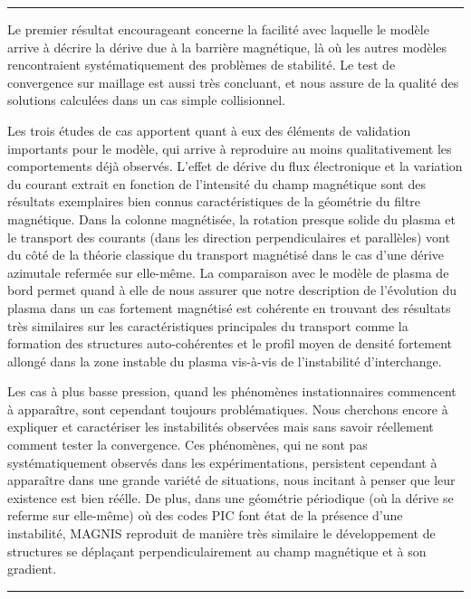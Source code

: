\begin{center}
\rule{0.6\textwidth}{1pt}
\end{center}

Le premier résultat encourageant concerne la facilité avec laquelle le modèle
arrive à décrire la dérive due à la barrière magnétique, là où les autres
modèles rencontraient systématiquement des problèmes de stabilité. Le test de
convergence sur maillage est aussi très concluant, et nous assure de la qualité
des solutions calculées dans un cas simple collisionnel. 

Les trois études de cas apportent quant à eux des éléments de validation
importants pour le modèle, qui arrive à reproduire au moins qualitativement les
comportements déjà observés. L'effet de dérive du flux électronique et la
variation du courant extrait en fonction de l'intensité du champ magnétique sont des
résultats exemplaires bien connus caractéristiques de la géométrie du filtre
magnétique.
Dans la colonne magnétisée, la rotation presque solide du plasma et le
transport des courants (dans les direction perpendiculaires et parallèles) vont
du côté de la théorie classique du transport magnétisé dans le cas d'une dérive
azimutale refermée sur elle-même.
La comparaison avec le modèle de plasma de bord permet quand à elle de nous
assurer que notre description de l'évolution du plasma dans un cas fortement
magnétisé est cohérente en trouvant des résultats très similaires sur les
caractéristiques principales du transport comme la formation des structures
auto-cohérentes et le profil moyen de densité fortement allongé dans la zone
instable du plasma vis-à-vis de l'instabilité d'interchange.

Les cas à plus basse pression, quand les phénomènes instationnaires
commencent à apparaître, sont cependant toujours problématiques. Nous
cherchons encore à expliquer et caractériser les instabilités observées mais
sans savoir réellement comment tester la convergence. Ces phénomènes, qui ne
sont pas systématiquement observés dans les expérimentations, 
persistent cependant à apparaître dans une grande variété de situations, nous
incitant à penser que leur existence est bien réélle. De plus, dans une
géométrie périodique (où la dérive se referme sur elle-même) où des codes PIC
font état de la présence d'une instabilité, MAGNIS reproduit de manière très similaire 
le développement de structures se déplaçant perpendiculairement au champ
magnétique et à son gradient.

\begin{center}
\rule{0.6\textwidth}{1pt}
\end{center}

